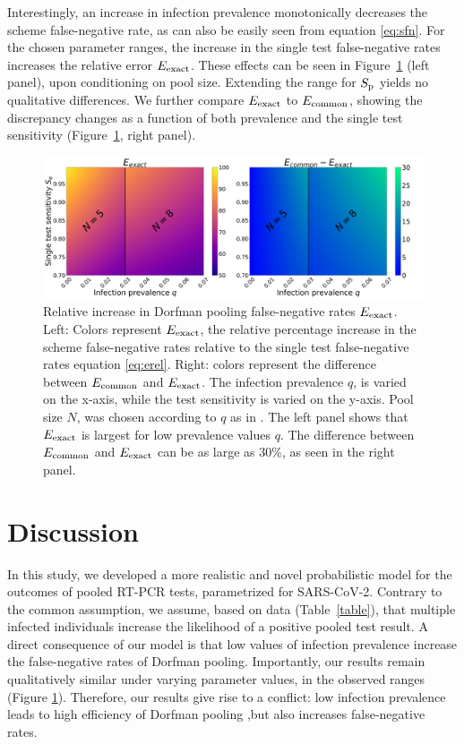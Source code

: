 \documentclass{article}
\begin{document}
Interestingly, an increase in infection prevalence monotonically
decreases the scheme false-negative rate, as can also be easily seen
from equation \eqref{eq:sfn}. For the chosen parameter ranges, the increase in
the single test false-negative rates increases the relative error
$E_{\text{{exact}}}$. These effects can be seen in Figure~\ref{fig1} (left
panel), upon conditioning on pool size. Extending the range for $S_\text{p}$
yields no qualitative differences. We further compare $E_{\text{{exact}}}$ to
$E_{\text{{common}}}$, showing the discrepancy changes as a function of both
prevalence and the single test sensitivity (Figure~\ref{fig1}, right
panel).
\begin{figure}[H]
  \centering
  \includegraphics[width=\textwidth]{heatmap_sfn.jpg}
  \caption{Relative increase in Dorfman pooling false-negative rates
    $E_{\text{{exact}}}$. Left: Colors represent $E_{\text{{exact}}}$, the relative
    percentage increase in the scheme false-negative rates relative to
    the single test false-negative rates equation \eqref{eq:erel}. Right:
    colors represent the difference between $E_{\text{{common}}}$ and
    $E_{\text{{exact}}}$. The infection prevalence $q$, is varied on the
    x-axis, while the test sensitivity is varied on the y-axis. Pool
    size $N$, was chosen according to $q$ as in
    \cite{DorfmanYuvalDor}. The left panel shows that $E_{\text{{exact}}}$ is
    largest for low prevalence values $q$. The difference between
    $E_{\text{{common}}}$ and $E_{\text{{exact}}}$ can be as large as 30\%, as seen
    in the right panel. }\label{fig1}
\end{figure}

\section*{Discussion}
In this study, we developed a more realistic and novel probabilistic
model for the outcomes of pooled RT-PCR tests, parametrized for
SARS-CoV-2. Contrary to the common assumption, we assume, based on
data (Table~\ref{table}), that multiple infected individuals increase
the likelihood of a positive pooled test result. A direct consequence
of our model is that low values of infection prevalence increase the
false-negative rates of Dorfman pooling. Importantly, our results
remain qualitatively similar under varying parameter values, in the
observed ranges \cite{KitComparison,EstimatingRatesKucrika,
  EstimatingRatesLourenco, InterpretingCOVID19Test} (Figure
\ref{fig1}). Therefore, our results give rise to a conflict: low
infection prevalence leads to high efficiency of Dorfman pooling
\cite{DorfmanYuvalDor},but also increases false-negative rates.
\end{document}
